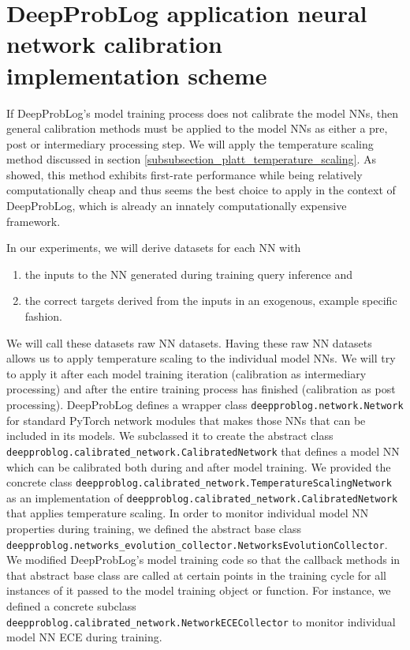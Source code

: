 \section{DeepProbLog application neural network calibration implementation scheme}
If DeepProbLog's model training process does not calibrate the model NNs, then general calibration methods must be applied to the model NNs as either a pre, post or intermediary processing step. We will apply the temperature scaling method discussed in section \ref{subsubsection_platt_temperature_scaling}. As \cite{guo2017calibration} showed, this method exhibits first-rate performance while being relatively computationally cheap and thus seems the best choice to apply in the context of DeepProbLog, which is already an innately computationally expensive framework. \par
In our experiments, we will derive datasets for each NN with
\begin{enumerate}
\item the inputs to the NN generated during training query inference and
\item the correct targets derived from the inputs in an exogenous, example specific fashion.
\end{enumerate}
We will call these datasets raw NN datasets. Having these raw NN datasets allows us to apply temperature scaling to the individual model NNs. We will try to apply it after each model training iteration (calibration as intermediary processing) and after the entire training process has finished (calibration as post processing). DeepProbLog defines a wrapper class \texttt{deepproblog.network.Network} for standard PyTorch network modules that makes those NNs that can be included in its models. We subclassed it to create the abstract class \texttt{deepproblog.calibrated\_network.CalibratedNetwork} that defines a model NN which can be calibrated both during and after model training. We provided the concrete class \texttt{deepproblog.calibrated\_network.TemperatureScalingNetwork} as an implementation of \texttt{deepproblog.calibrated\_network.CalibratedNetwork} that applies temperature scaling. In order to monitor individual model NN properties during training, we defined the abstract base class \texttt{deepproblog.networks\_evolution\_collector.NetworksEvolutionCollector}. We modified DeepProbLog's model training code so that the callback methods in that abstract base class are called at certain points in the training cycle for all instances of it passed to the model training object or function. For instance, we defined a concrete subclass \texttt{deepproblog.calibrated\_network.NetworkECECollector} to monitor individual model NN ECE during training. \par
